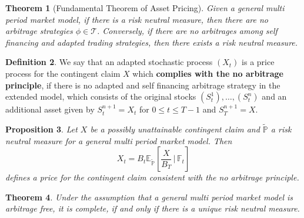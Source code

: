 \documentclass[10pt, oneside, reqno]{amsart}
\theoremstyle{plain}%
\newtheorem{thm}{Theorem}[subsection]
\newtheorem{prop}[thm]{Proposition}
\theoremstyle{definition}
\newtheorem{defn}[thm]{Definition}
\theoremstyle{remark}
\newcommand{\expp}[1]{\mathbb{E}_{\rnm}\left[#1\right]}
\newcommand{\given}{ \, | \,}
\newcommand{\F}{\mathbb{F}}
\newcommand{\rnm}{\tilde{\mathbb{P}}}
\begin{document}
\begin{thm}[Fundamental Theorem of Asset Pricing]
	Given a general multi period market model, if there is a risk neutral measure, then there are no arbitrage strategies $\phi \in \mathcal{T}$.  Conversely, if there are no arbitrages among self financing and adapted trading strategies, then there exists a risk neutral measure.
\end{thm}

\begin{defn}We say that an adapted stochastic process $(X_t)$ is a price process for the contingent claim $X$ which \textbf{complies with the no arbitrage principle}, if there is no adapted and self financing arbitrage strategy in the extended model, which consists of the original stocks $(S_t^1),\dots,(S_t^n)$ and an additional asset given by $S^{n+1}_t = X_t$ for $0 \leq t \leq T-1$ and $S^{n+1}_T = X$. 
\end{defn}

\begin{prop}
	Let $X$ be a possibly unattainable contingent claim and $\rnm$ a risk neutral measure for a general multi period market model.  Then \[
		X_t = B_t \expp{\frac{X}{B_T} \given \F_t}
	\] defines a price for the contingent claim consistent with the no arbitrage principle.
\end{prop}

\begin{thm}
	Under the assumption that a general multi period market model is arbitrage free, it is complete, if and only if there is a unique risk neutral measure.
\end{thm}


\end{document}
